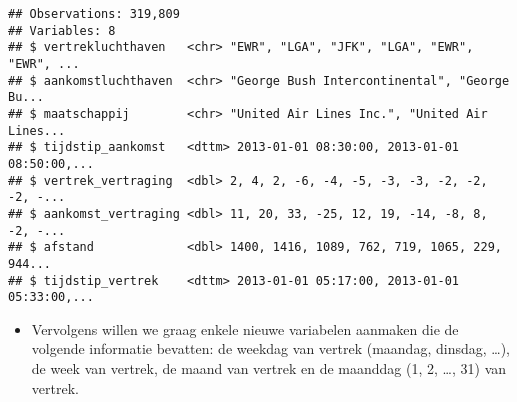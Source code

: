 \documentclass[]{memoir}
\newenvironment{Shaded}{\begin{snugshade}}{\end{snugshade}}
\newcommand{\KeywordTok}[1]{\textcolor[rgb]{0.13,0.29,0.53}{\textbf{#1}}}
\newcommand{\DataTypeTok}[1]{\textcolor[rgb]{0.13,0.29,0.53}{#1}}
\newcommand{\StringTok}[1]{\textcolor[rgb]{0.31,0.60,0.02}{#1}}
\newcommand{\OperatorTok}[1]{\textcolor[rgb]{0.81,0.36,0.00}{\textbf{#1}}}
\newcommand{\NormalTok}[1]{#1}
\providecommand{\tightlist}{%
  \setlength{\itemsep}{0pt}\setlength{\parskip}{0pt}}
\begin{document}
\begin{Shaded}
\end{Shaded}

\begin{verbatim}
## Observations: 319,809
## Variables: 8
## $ vertrekluchthaven   <chr> "EWR", "LGA", "JFK", "LGA", "EWR", "EWR", ...
## $ aankomstluchthaven  <chr> "George Bush Intercontinental", "George Bu...
## $ maatschappij        <chr> "United Air Lines Inc.", "United Air Lines...
## $ tijdstip_aankomst   <dttm> 2013-01-01 08:30:00, 2013-01-01 08:50:00,...
## $ vertrek_vertraging  <dbl> 2, 4, 2, -6, -4, -5, -3, -3, -2, -2, -2, -...
## $ aankomst_vertraging <dbl> 11, 20, 33, -25, 12, 19, -14, -8, 8, -2, -...
## $ afstand             <dbl> 1400, 1416, 1089, 762, 719, 1065, 229, 944...
## $ tijdstip_vertrek    <dttm> 2013-01-01 05:17:00, 2013-01-01 05:33:00,...
\end{verbatim}

\begin{itemize}
\tightlist
\item
  Vervolgens willen we graag enkele nieuwe variabelen aanmaken die de
  volgende informatie bevatten: de weekdag van vertrek (maandag,
  dinsdag, \ldots{}), de week van vertrek, de maand van vertrek en de
  maanddag (1, 2, \ldots{}, 31) van vertrek.
\end{itemize}

\begin{Shaded}
\end{Shaded}
\end{document}
